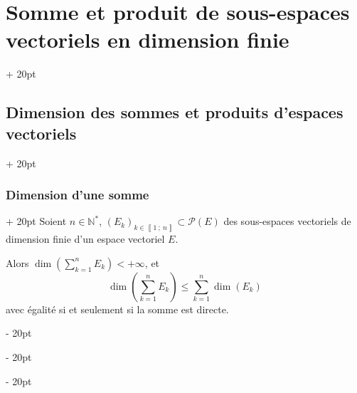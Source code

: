 \documentclass[a4paper, 12pt, twoside]{article}
\newcommand{\N}{\mathbb{N}} %
\newcommand{\nset}[2]{\left\llbracket #1\ ;\ #2 \right\rrbracket}
\newcommand{\lr}[1]{\left( #1 \right)}
\renewcommand{\le}{\leqslant}
\newcommand{\ind}[1][20pt]{\advance\leftskip + #1}
\newcommand{\deind}[1][20pt]{\advance\leftskip - #1}
\newenvironment{indt}[2][20pt]{#2 \par \ind[#1]}{\par \deind} %
\begin{document}
\begin{indt}{\section{Somme et produit de sous-espaces vectoriels en dimension finie}}
\begin{indt}{\subsection{Dimension des sommes et produits d'espaces vectoriels}}
            \vspace{12pt}
            
            \begin{indt}{\subsubsection{Dimension d'une somme}}
                Soient $n \in \N^*$, $(E_k)_{k \in \nset 1 n} \subset \mathcal P(E)$ des sous-espaces vectoriels de dimension finie d'un espace vectoriel $E$.
                
                Alors $\displaystyle \dim\!\lr{\sum_{k = 1}^n E_k} < +\infty$, et
                    \[ \dim\!\lr{\sum_{k = 1}^n E_k} \le \sum_{k = 1}^n \dim(E_k) \]
                avec égalité si et seulement si la somme est directe.
            \end{indt}
        \end{indt}
        
    \end{indt}
    
    
    
\end{document}
